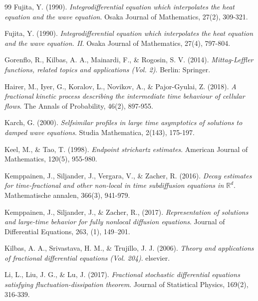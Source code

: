 \documentclass{amsart}
\theoremstyle{definition}
\theoremstyle{remark}
\numberwithin{equation}{section}
\begin{document}
{\begin{thebibliography}{99}
Fujita, Y. (1990). \textit{Integrodifferential equation which interpolates the heat equation and the wave equation}. Osaka Journal of Mathematics, 27(2), 309-321.

Fujita, Y. (1990). \textit{Integrodifferential equation which interpolates the heat equation and the wave equation. II}. Osaka Journal of Mathematics, 27(4), 797-804.

	Gorenflo, R., Kilbas, A. A., Mainardi, F., \& Rogosin, S. V. (2014). \textit{Mittag-Leffler functions, related topics and applications (Vol. 2)}. Berlin: Springer.
	
	
	Hairer, M., Iyer, G., Koralov, L., Novikov, A., \& Pajor-Gyulai, Z. (2018). \textit{A fractional kinetic process describing the intermediate time behaviour of cellular flows}. The Annals of Probability, 46(2), 897-955.



Karch, G. (2000). \textit{Selfsimilar profiles in large time asymptotics of solutions to damped wave equations}. Studia Mathematica, 2(143), 175-197.

Keel, M., \& Tao, T. (1998). \textit{Endpoint strichartz estimates}. American Journal of Mathematics, 120(5), 955-980.

Kemppainen, J., Siljander, J., Vergara, V., \& Zacher, R. (2016). \textit{Decay estimates for time-fractional and other non-local in time subdiffusion equations in $\mathbb {R}^d$}. Mathematische annalen, 366(3), 941-979.

Kemppainen, J., Siljander, J., \& Zacher, R., (2017). \textit{Representation of solutions and large-time behavior for fully nonlocal diffusion equations}. Journal of Differential Equations,  263, (1),  149--201.
	
	
	Kilbas, A. A., Srivastava, H. M., \& Trujillo, J. J. (2006). \textit{Theory and applications of fractional differential equations (Vol. 204)}. elsevier.
	

	
	Li, L., Liu, J. G., \& Lu, J. (2017). \textit{Fractional stochastic differential equations satisfying fluctuation-dissipation theorem}. Journal of Statistical Physics, 169(2), 316-339.
	

\end{thebibliography}}
\end{document}
